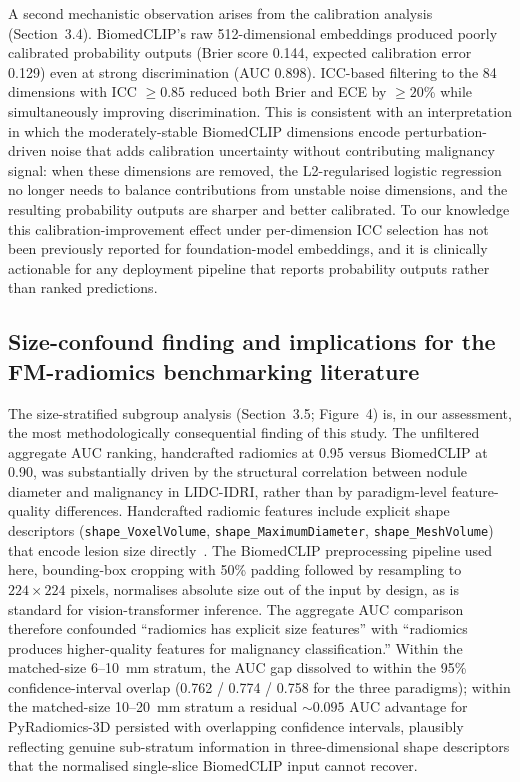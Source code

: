 A second mechanistic observation arises from the calibration analysis (Section~3.4). BiomedCLIP's raw 512-dimensional embeddings produced poorly calibrated probability outputs (Brier score 0.144, expected calibration error 0.129) even at strong discrimination (AUC 0.898). ICC-based filtering to the 84 dimensions with ICC $\geq 0.85$ reduced both Brier and ECE by $\geq 20$\% while simultaneously improving discrimination. This is consistent with an interpretation in which the moderately-stable BiomedCLIP dimensions encode perturbation-driven noise that adds calibration uncertainty without contributing malignancy signal: when these dimensions are removed, the L2-regularised logistic regression no longer needs to balance contributions from unstable noise dimensions, and the resulting probability outputs are sharper and better calibrated. To our knowledge this calibration-improvement effect under per-dimension ICC selection has not been previously reported for foundation-model embeddings, and it is clinically actionable for any deployment pipeline that reports probability outputs rather than ranked predictions.

\subsection{Size-confound finding and implications for the FM-radiomics benchmarking literature}

The size-stratified subgroup analysis (Section~3.5; Figure~4) is, in our assessment, the most methodologically consequential finding of this study. The unfiltered aggregate AUC ranking, handcrafted radiomics at 0.95 versus BiomedCLIP at 0.90, was substantially driven by the structural correlation between nodule diameter and malignancy in LIDC-IDRI, rather than by paradigm-level feature-quality differences. Handcrafted radiomic features include explicit shape descriptors (\texttt{shape\_VoxelVolume}, \texttt{shape\_MaximumDiameter}, \texttt{shape\_MeshVolume}) that encode lesion size directly~\cite{vangriethuysen2017,zwanenburg2020}. The BiomedCLIP preprocessing pipeline used here, bounding-box cropping with 50\% padding followed by resampling to $224 \times 224$ pixels, normalises absolute size out of the input by design, as is standard for vision-transformer inference. The aggregate AUC comparison therefore confounded ``radiomics has explicit size features'' with ``radiomics produces higher-quality features for malignancy classification.'' Within the matched-size 6--10~mm stratum, the AUC gap dissolved to within the 95\% confidence-interval overlap (0.762 / 0.774 / 0.758 for the three paradigms); within the matched-size 10--20~mm stratum a residual $\sim 0.095$ AUC advantage for PyRadiomics-3D persisted with overlapping confidence intervals, plausibly reflecting genuine sub-stratum information in three-dimensional shape descriptors that the normalised single-slice BiomedCLIP input cannot recover.

